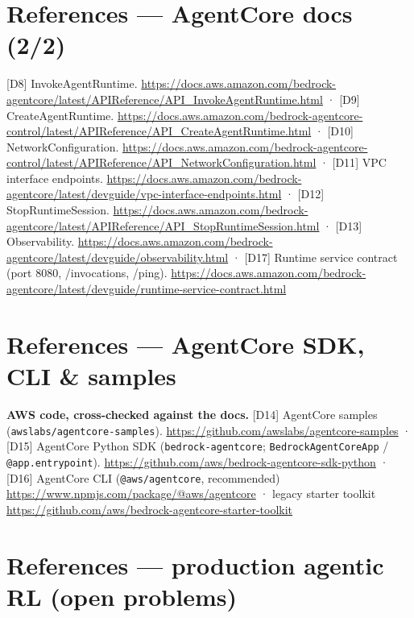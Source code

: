 \documentclass[
  paper=a4,
  ,captions=tableheading
]{scrartcl}
\begin{document}
\hypertarget{references-agentcore-docs-22}{%
\section{References --- AgentCore docs
(2/2)}\label{references-agentcore-docs-22}}

\scriptsize

{[}D8{]} InvokeAgentRuntime.
\url{https://docs.aws.amazon.com/bedrock-agentcore/latest/APIReference/API_InvokeAgentRuntime.html}
· {[}D9{]} CreateAgentRuntime.
\url{https://docs.aws.amazon.com/bedrock-agentcore-control/latest/APIReference/API_CreateAgentRuntime.html}
· {[}D10{]} NetworkConfiguration.
\url{https://docs.aws.amazon.com/bedrock-agentcore-control/latest/APIReference/API_NetworkConfiguration.html}
· {[}D11{]} VPC interface endpoints.
\url{https://docs.aws.amazon.com/bedrock-agentcore/latest/devguide/vpc-interface-endpoints.html}
· {[}D12{]} StopRuntimeSession.
\url{https://docs.aws.amazon.com/bedrock-agentcore/latest/APIReference/API_StopRuntimeSession.html}
· {[}D13{]} Observability.
\url{https://docs.aws.amazon.com/bedrock-agentcore/latest/devguide/observability.html}
· {[}D17{]} Runtime service contract (port 8080, /invocations, /ping).
\url{https://docs.aws.amazon.com/bedrock-agentcore/latest/devguide/runtime-service-contract.html}

\hypertarget{references-agentcore-sdk-cli-samples}{%
\section{References --- AgentCore SDK, CLI \&
samples}\label{references-agentcore-sdk-cli-samples}}

\scriptsize

\textbf{AWS code, cross-checked against the docs.} {[}D14{]} AgentCore
samples (\texttt{awslabs/agentcore-samples}).
\url{https://github.com/awslabs/agentcore-samples} · {[}D15{]} AgentCore
Python SDK (\texttt{bedrock-agentcore}; \texttt{BedrockAgentCoreApp} /
\texttt{@app.entrypoint}).
\url{https://github.com/aws/bedrock-agentcore-sdk-python} · {[}D16{]}
AgentCore CLI (\texttt{@aws/agentcore}, recommended)
\url{https://www.npmjs.com/package/@aws/agentcore} · legacy starter
toolkit \url{https://github.com/aws/bedrock-agentcore-starter-toolkit}

\hypertarget{references-production-agentic-rl-open-problems}{%
\section{References --- production agentic RL (open
problems)}\label{references-production-agentic-rl-open-problems}}
\end{document}
